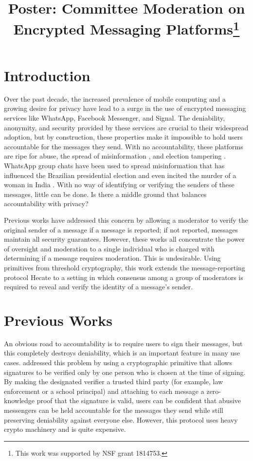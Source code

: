 \documentclass[conference]{IEEEtran}
\title{Poster: Committee Moderation on Encrypted Messaging Platforms\thanks{This work was supported by NSF grant 1814753.}}
\author{
    \IEEEauthorblockN{Alistair Pattison}
    \IEEEauthorblockA{
        \textit{University of Minnesota and Carleton College} \\
        pattisona@carleton.edu
    } \and
    \IEEEauthorblockN{Nicholas Hopper}
    \IEEEauthorblockA{
        \textit{University of Minnesota} \\
        hoppernj@umn.edu
    }
}
\begin{document}
\maketitle


\section{Introduction}

Over the past decade, the increased prevalence of mobile computing and a growing desire for privacy have lead to a surge in the use of encrypted messaging services like WhatsApp, Facebook Messenger, and Signal.
The deniability, anonymity, and security provided by these services are crucial to their widespread adoption, but by construction, these properties make it impossible to hold users accountable for the messages they send.
With no accountability, these platforms are ripe for abuse, the spread of misinformation \cite{wapo-fake-news-whatsapp}, and election tampering \cite{oxford-computational-propoganda-report}.
WhatsApp group chats have been used to spread misinformation that has influenced the Brazilian presidential election \cite{pbs-brazil-whatsapp} and even incited the murder of a woman in India \cite{nytimes-whatsapp-india-murder}.
With no way of identifying or verifying the senders of these messages, little can be done.
Is there a middle ground that balances accountability with privacy?

Previous works have addressed this concern by allowing a moderator to verify the original sender of a message if a message is reported; if not reported, messages maintain all security guarantees.
However, these works all concentrate the power of oversight and moderation to a single individual who is charged with determining if a message requires moderation.
This is undesirable.
Using primitives from threshold cryptography, this work extends the message-reporting protocol Hecate \cite{hecate} to a setting in which consensus among a group of moderators is required to reveal and verify the identity of a message's sender.

\section{Previous Works}

An obvious road to accountability is to require users to sign their messages, but this completely destroys deniability, which is an important feature in many use cases.
\textcite{tglmr} addressed this problem by using a cryptographic primitive that allows signatures to be verified only by one person who is chosen at the time of signing.
By making the designated verifier a trusted third party (for example, law enforcement or a school principal) and attaching to each message a zero-knowledge proof that the signature is valid, users can be confident that abusive messengers can be held accountable for the messages they send while still preserving deniability against everyone else.
However, this protocol uses heavy crypto machinery and is quite expensive.
\end{document}
